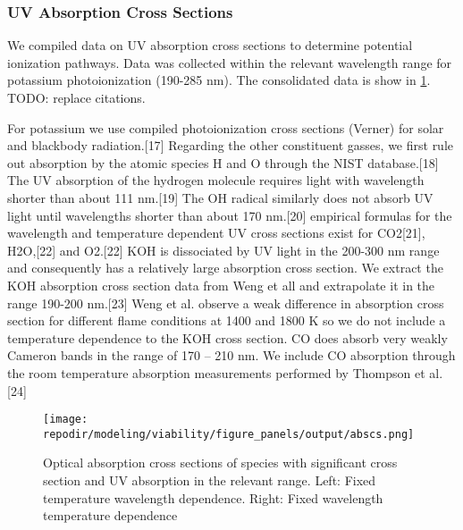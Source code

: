\subsubsection{UV Absorption Cross Sections}

We compiled data on UV absorption cross sections to determine potential ionization pathways. Data was collected within the relevant wavelength range for potassium photoionization (190-285 nm). The consolidated data is show in \ref{fig:SI_UV_abscs}. TODO: replace citations. 

For potassium we use compiled photoionization cross sections (Verner) for solar and blackbody radiation.{[}17{]} Regarding the other constituent gasses, we first rule out absorption by the atomic species H and O through the NIST database.{[}18{]} The UV absorption of the hydrogen molecule requires light with wavelength shorter than about 111 nm.{[}19{]} The OH radical similarly does not absorb UV light until wavelengths shorter than about 170 nm.{[}20{]} empirical formulas for the wavelength and temperature dependent UV cross sections exist for CO2{[}21{]}, H2O,{[}22{]} and O2.{[}22{]} KOH is dissociated by UV light in the 200-300 nm range and consequently has a relatively large absorption cross section. We extract the KOH absorption cross section data from Weng et all and extrapolate it in the range 190-200 nm.{[}23{]} Weng et al. observe a weak difference in absorption cross section for different flame conditions at 1400 and 1800 K so we do not include a temperature dependence to the KOH cross section. CO does absorb very weakly Cameron bands in the range of 170 -- 210 nm. We include CO absorption through the room temperature absorption measurements performed by Thompson et al.{[}24{]}


\begin{figure}[h]
    \texttt{[image: \\repodir/modeling/viability/figure\_panels/output/abscs.png]} 
    \caption{Optical absorption cross sections of species with significant cross section and UV absorption in the relevant range. Left: Fixed temperature wavelength dependence. Right: Fixed wavelength temperature dependence}
    \label{fig:SI_UV_abscs}
\end{figure}







